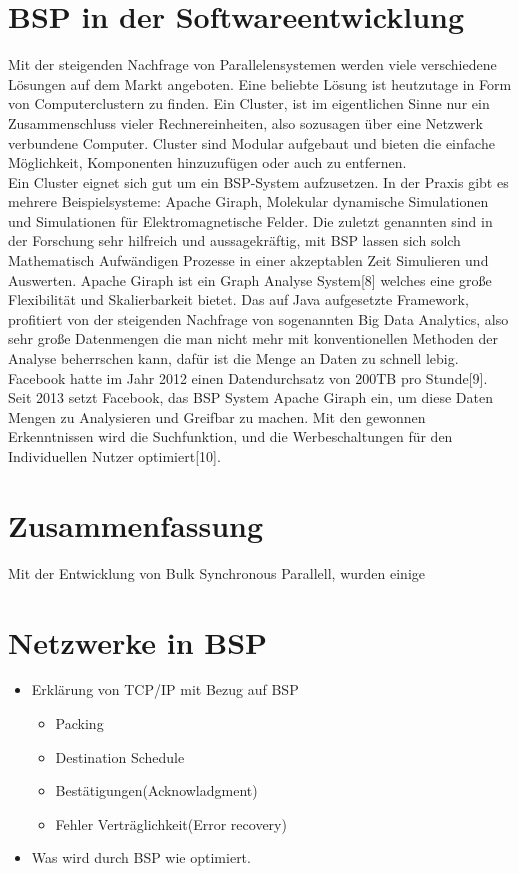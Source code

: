 \documentclass[a4paper,10pt]{scrartcl}
\begin{document}
\section{BSP in der Softwareentwicklung}
Mit der steigenden Nachfrage von Parallelensystemen werden viele verschiedene Lösungen auf dem Markt angeboten. Eine beliebte Lösung ist heutzutage in Form von Computerclustern zu finden. Ein Cluster, ist im eigentlichen Sinne nur ein Zusammenschluss vieler Rechnereinheiten, also sozusagen über eine Netzwerk verbundene Computer. Cluster sind Modular aufgebaut und bieten die einfache Möglichkeit, Komponenten hinzuzufügen oder auch zu entfernen. \\
Ein Cluster eignet sich gut um ein BSP-System aufzusetzen. In der Praxis gibt es mehrere Beispielsysteme: Apache Giraph, Molekular dynamische Simulationen und Simulationen für Elektromagnetische Felder. Die zuletzt genannten sind in der Forschung sehr hilfreich und aussagekräftig, mit BSP lassen sich solch Mathematisch Aufwändigen Prozesse in einer akzeptablen Zeit Simulieren und Auswerten. Apache Giraph ist ein Graph Analyse System[8] welches eine große Flexibilität und Skalierbarkeit bietet. Das auf Java aufgesetzte Framework, profitiert von der steigenden Nachfrage von sogenannten Big Data Analytics, also sehr große Datenmengen die man nicht mehr mit konventionellen Methoden der Analyse beherrschen kann, dafür ist die Menge an Daten zu schnell lebig. Facebook hatte im Jahr 2012 einen Datendurchsatz von 200TB pro Stunde[9]. Seit 2013 setzt Facebook, das BSP System Apache Giraph ein, um diese Daten Mengen zu Analysieren und Greifbar zu machen. Mit den gewonnen Erkenntnissen wird die Suchfunktion, und die Werbeschaltungen für den Individuellen Nutzer optimiert[10].
\section{Zusammenfassung}
Mit der Entwicklung von Bulk Synchronous Parallell, wurden einige 

\section{Netzwerke in BSP}
\begin{itemize}
\item Erklärung von TCP/IP mit Bezug auf BSP
\begin{itemize}
\item Packing
\item Destination Schedule
\item Bestätigungen(Acknowladgment)
\item Fehler Verträglichkeit(Error recovery)
\end{itemize}
\item Was wird durch BSP wie optimiert.

\end{itemize}
\end{document}
